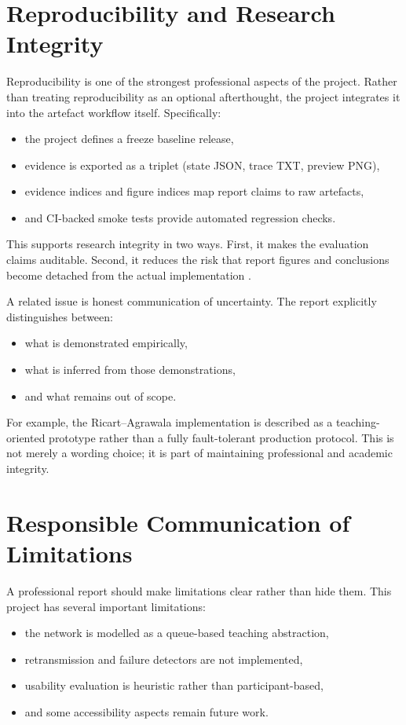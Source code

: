 \section{Reproducibility and Research Integrity}
Reproducibility is one of the strongest professional aspects of the project. Rather than treating reproducibility as an optional afterthought, the project integrates it into the artefact workflow itself. Specifically:
\begin{itemize}
  \item the project defines a freeze baseline release,
  \item evidence is exported as a triplet (state JSON, trace TXT, preview PNG),
  \item evidence indices and figure indices map report claims to raw artefacts,
  \item and CI-backed smoke tests provide automated regression checks.
\end{itemize}

This supports research integrity in two ways. First, it makes the evaluation claims auditable. Second, it reduces the risk that report figures and conclusions become detached from the actual implementation \cite{sandve2013ten,wilson2014best,wilkinson2016fair}.

A related issue is honest communication of uncertainty. The report explicitly distinguishes between:
\begin{itemize}
  \item what is demonstrated empirically,
  \item what is inferred from those demonstrations,
  \item and what remains out of scope.
\end{itemize}
For example, the Ricart--Agrawala implementation is described as a teaching-oriented prototype rather than a fully fault-tolerant production protocol. This is not merely a wording choice; it is part of maintaining professional and academic integrity.

\section{Responsible Communication of Limitations}
A professional report should make limitations clear rather than hide them. This project has several important limitations:
\begin{itemize}
  \item the network is modelled as a queue-based teaching abstraction,
  \item retransmission and failure detectors are not implemented,
  \item usability evaluation is heuristic rather than participant-based,
  \item and some accessibility aspects remain future work.
\end{itemize}

